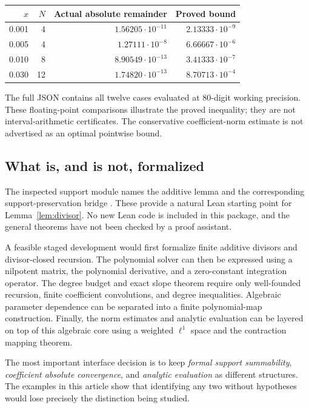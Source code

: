 \documentclass[11pt,a4paper]{article}
\numberwithin{equation}{section}
\theoremstyle{definition}
\theoremstyle{remark}
\begin{document}
\begin{center}
\begin{tabular}{@{}rrrr@{}}
\toprule
\(x\) & \(N\) & Actual absolute remainder & Proved bound\\
\midrule
0.001 & 4 & \(1.56205\cdot10^{-11}\) & \(2.13333\cdot10^{-9}\)\\
0.005 & 4 & \(1.27111\cdot10^{-8}\) & \(6.66667\cdot10^{-6}\)\\
0.010 & 8 & \(8.90549\cdot10^{-13}\) & \(3.41333\cdot10^{-7}\)\\
0.030 & 12 & \(1.74820\cdot10^{-13}\) & \(8.70713\cdot10^{-4}\)\\
\bottomrule
\end{tabular}
\end{center}

The full JSON contains all twelve cases evaluated at 80-digit working
precision. These floating-point comparisons illustrate the proved
inequality; they are not interval-arithmetic certificates. The
conservative coefficient-norm estimate is not advertised as an
optimal pointwise bound.

\subsection{What is, and is not, formalized}
The inspected support module names the additive lemma
 and the corresponding
support-preservation bridge \cite{repo-support}. These provide a
natural Lean starting point for Lemma~\ref{lem:divisor}. No new Lean
code is included in this package, and the general theorems have not
been checked by a proof assistant.

A feasible staged development would first formalize finite additive
divisors and divisor-closed recursion. The polynomial solver can then
be expressed using a nilpotent matrix, the polynomial derivative,
and a zero-constant integration operator. The degree budget and exact
slope theorem require only well-founded recursion, finite
coefficient convolutions, and degree inequalities. Algebraic
parameter dependence can be separated into a finite polynomial-map
construction. Finally, the norm estimates and analytic evaluation
can be layered on top of this algebraic core using a weighted
\(\ell^1\) space and the contraction mapping theorem.

The most important interface decision is to keep \emph{formal
support summability}, \emph{coefficient absolute convergence}, and
\emph{analytic evaluation} as different structures. The examples in
this article show that identifying any two without hypotheses would
lose precisely the distinction being studied.
\end{document}
